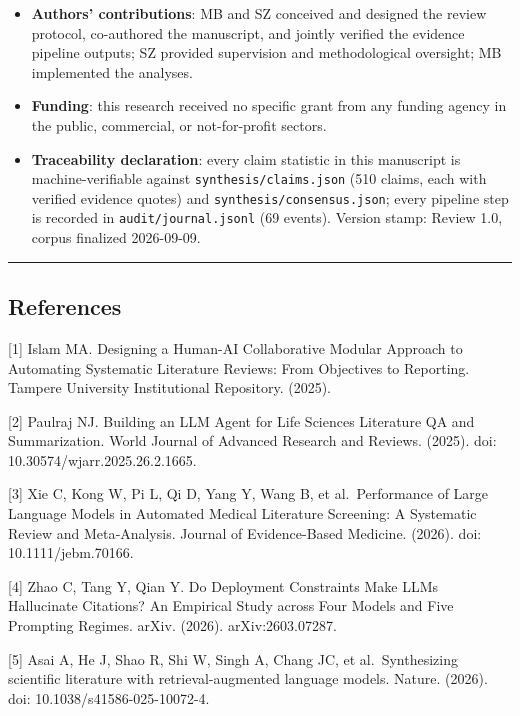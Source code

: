 \documentclass[11pt]{article}
\begin{document}
\begin{itemize}
  Nexus Scholar toolkit was excluded from the review matrix.
\item
  \textbf{Authors' contributions}: MB and SZ conceived and designed the
  review protocol, co-authored the manuscript, and jointly verified the
  evidence pipeline outputs; SZ provided supervision and methodological
  oversight; MB implemented the analyses.
\item
  \textbf{Funding}: this research received no specific grant from any
  funding agency in the public, commercial, or not-for-profit sectors.
\item
  \textbf{Traceability declaration}: every claim statistic in this
  manuscript is machine-verifiable against
  \texttt{synthesis/claims.json} (510 claims, each with verified
  evidence quotes) and \texttt{synthesis/consensus.json}; every pipeline
  step is recorded in \texttt{audit/journal.jsonl} (69 events). Version
  stamp: Review 1.0, corpus finalized 2026-09-09.
\end{itemize}

\begin{center}\rule{0.5\linewidth}{0.5pt}\end{center}

\subsection{References}\label{references}

{[}1{]} Islam MA. Designing a Human-AI Collaborative Modular Approach to
Automating Systematic Literature Reviews: From Objectives to Reporting.
Tampere University Institutional Repository. (2025).

{[}2{]} Paulraj NJ. Building an LLM Agent for Life Sciences Literature
QA and Summarization. World Journal of Advanced Research and Reviews.
(2025). doi: 10.30574/wjarr.2025.26.2.1665.

{[}3{]} Xie C, Kong W, Pi L, Qi D, Yang Y, Wang B, et al.~Performance of
Large Language Models in Automated Medical Literature Screening: A
Systematic Review and Meta‐Analysis. Journal of Evidence-Based Medicine.
(2026). doi: 10.1111/jebm.70166.

{[}4{]} Zhao C, Tang Y, Qian Y. Do Deployment Constraints Make LLMs
Hallucinate Citations? An Empirical Study across Four Models and Five
Prompting Regimes. arXiv. (2026). arXiv:2603.07287.

{[}5{]} Asai A, He J, Shao R, Shi W, Singh A, Chang JC, et
al.~Synthesizing scientific literature with retrieval-augmented language
models. Nature. (2026). doi: 10.1038/s41586-025-10072-4.
\end{document}
